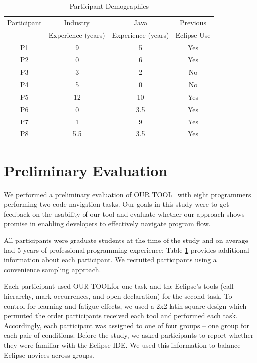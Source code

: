 \documentclass[conference]{IEEEtran}
\newcommand{\toolName}{OUR TOOL}
\begin{document}
\begin{table}
\centering
\caption{Participant Demographics}
\begin{tabular}{|c|c|c|c|}
\hline
Participant & Industry & Java &\multicolumn{1}{c|}{Previous} \\
& Experience (years) & Experience (years) & \multicolumn{1}{c|}{Eclipse Use} \\
\hline
P1 & 9 & 5 & Yes \\
\hline
P2 & 0 & 6 & Yes \\
\hline
P3 & 3 & 2 & No \\
\hline
P4 & 5 & 0 & No \\
\hline
P5 & 12 & 10 & Yes \\
\hline
P6 & 0 & 3.5 & Yes \\
\hline
P7 & 1 & 9 & Yes \\
\hline
P8 & 5.5 & 3.5 & Yes \\
\hline
\end{tabular}
\label{table:participants}
\end{table}

\section{Preliminary Evaluation}
We performed a preliminary evaluation of \toolName~ with eight programmers performing two code navigation tasks.
Our goals in this study were to get feedback on the usability of our tool and evaluate whether our approach shows promise in enabling developers to effectively navigate program flow. 

All participants were graduate students at the time of the study and on average had 5 years of professional programming experience; Table \ref{table:participants} provides additional information about each participant. We recruited participants using a convenience sampling approach. 

Each participant used \toolName for one task and the Eclipse's tools (call hierarchy, mark occurrences, and open declaration) for the second task.
To control for learning and fatigue effects, we used a 2x2 latin square design which permuted the order participants received each tool and performed each task. Accordingly, each participant was assigned to one of four groups -- one group for each pair of conditions.
Before the study, we asked participants to report whether they were familiar with the Eclipse IDE. We used this information to balance Eclipse novices across groups.
\end{document}
